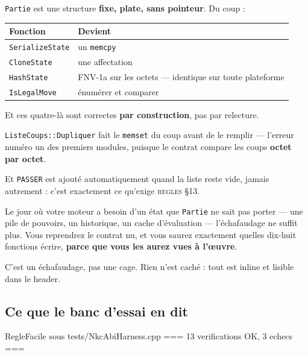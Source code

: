 \texttt{Partie} est une structure \textbf{fixe, plate, sans pointeur}. Du coup :

\begin{center}
\begin{tabular}{@{}p{4.4cm}p{9.4cm}@{}}
\toprule
\textbf{Fonction} & \textbf{Devient} \\
\midrule
\texttt{SerializeState} & un \texttt{memcpy} \\
\texttt{CloneState} & une affectation \\
\texttt{HashState} & FNV-1a sur les octets — identique sur toute plateforme \\
\texttt{IsLegalMove} & énumérer et comparer \\
\bottomrule
\end{tabular}
\end{center}

Et ces quatre-là sont correctes \textbf{par construction}, pas par relecture.

\begin{nkretenir}
\texttt{ListeCoups::Dupliquer} fait le \texttt{memset} du coup avant de le
remplir — l'erreur numéro un des premiers modules, puisque le contrat compare les
coups \textbf{octet par octet}.

Et \texttt{PASSER} est ajouté automatiquement quand la liste reste vide, jamais
autrement : c'est exactement ce qu'exige \textsc{regles §13}.
\end{nkretenir}

\begin{nkpiege}
Le jour où votre moteur a besoin d'un état que \texttt{Partie} ne sait pas porter
— une pile de pouvoirs, un historique, un cache d'évaluation — l'échafaudage ne
suffit plus. Vous reprendrez le contrat nu, et vous saurez exactement quelles
dix-huit fonctions écrire, \textbf{parce que vous les aurez vues à l'œuvre}.

C'est un échafaudage, pas une cage. Rien n'est caché : tout est inline et lisible
dans le header.
\end{nkpiege}

\subsection{Ce que le banc d'essai en dit}

\begin{nkcode}{RegleFacile sous tests/NkcAbiHarness.cpp}
=== 13 verifications OK, 3 echecs ===
\end{nkcode}


